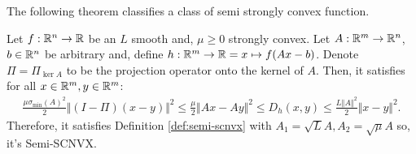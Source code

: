 \documentclass[12pt]{article}
\begin{document}
        The following theorem classifies a class of semi strongly convex function. 
        \begin{theorem}\label{thm:aff-smooth-sq-scnvx}
            Let $f: \mathbb R^n \rightarrow \mathbb R$ be an $L$ smooth and, $\mu \ge 0$ strongly convex.
            Let $A: \mathbb R^m \rightarrow \mathbb R^n$, $b \in \mathbb R^n$ be arbitrary and, define $h: \mathbb R^m \rightarrow \mathbb R= x \mapsto f(Ax - b)$. 
            Denote $\Pi = \Pi_{\ker A}$ to be the projection operator onto the kernel of $A$. 
            Then, it satisfies for all $x \in \mathbb R^m, y \in \mathbb R^m$:  
            \begin{align*}
                \frac{\mu \sigma_{\min}(A)^2}{2}\Vert (I - \Pi)(x - y)\Vert^2
                \le \frac{\mu}{2}\Vert Ax - Ay\Vert^2 
                \le D_h(x, y) \le \frac{L\Vert A\Vert^2}{2}\Vert x - y\Vert^2. 
            \end{align*}
            Therefore, it satisfies Definition \ref{def:semi-scnvx} with $A_1 = \sqrt{L}A, A_2 = \sqrt{\mu}A$ so, it's Semi-SCNVX. 
        \end{theorem}
\end{document}
